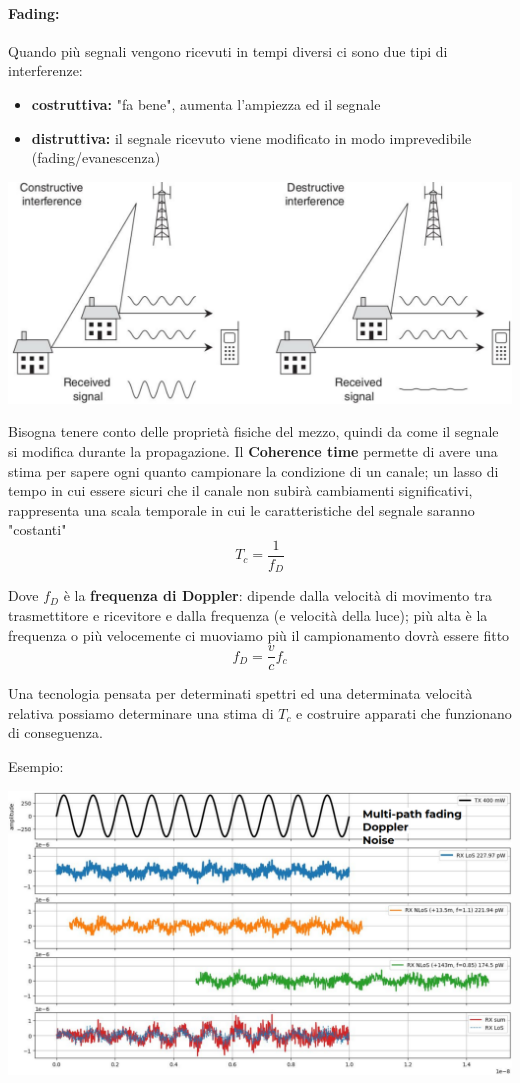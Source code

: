 \paragraph{Fading:} Quando più segnali vengono ricevuti in tempi diversi ci sono due tipi di interferenze: 
\begin{itemize}
	\item \textbf{costruttiva:} "fa bene", aumenta l'ampiezza ed il segnale
    
	\item \textbf{distruttiva:} il segnale ricevuto viene modificato in modo imprevedibile (fading/evanescenza)
\end{itemize}
\begin{center}
	\includegraphics[width=0.85\linewidth]{img/wireless/fading}
\end{center}

Bisogna tenere conto delle proprietà fisiche del mezzo, quindi da come il segnale si modifica durante la propagazione. Il \textbf{Coherence time} permette di avere una stima per sapere ogni quanto campionare la condizione di un canale; un lasso di tempo in cui essere sicuri che il canale non subirà cambiamenti significativi, rappresenta una scala temporale in cui le caratteristiche del segnale saranno "costanti"
$$ T_c = \frac{1}{f_D}$$

Dove $f_D$ è la \textbf{frequenza di Doppler}: dipende dalla velocità di movimento tra trasmettitore e ricevitore e dalla frequenza (e velocità della luce); più alta è la frequenza o più velocemente ci muoviamo più il campionamento dovrà essere fitto
$$ f_D = \frac{v}{c} f_c$$

Una tecnologia pensata per determinati spettri ed una determinata velocità relativa possiamo determinare una stima di $T_c$ e costruire apparati che funzionano di conseguenza.

Esempio:
\begin{center}
	\includegraphics[width=0.9\linewidth]{img/wireless/examplemultipath}
\end{center}

